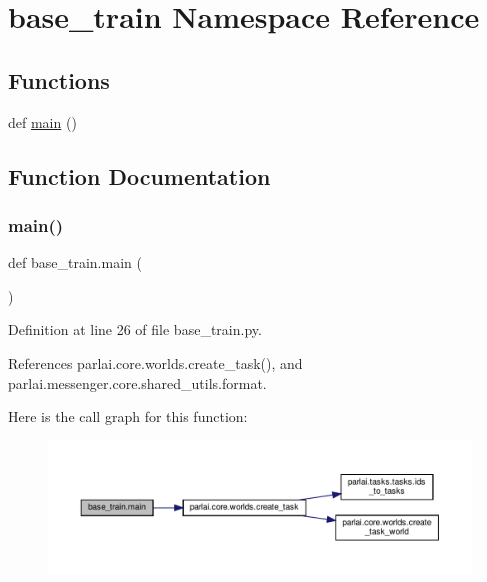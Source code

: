 \hypertarget{namespacebase__train}{}\section{base\+\_\+train Namespace Reference}
\label{namespacebase__train}
\subsection*{Functions}
\begin{DoxyCompactItemize}
\item 
def \hyperlink{namespacebase__train_afacf60925509c7e52f77f41e331261f3}{main} ()
\end{DoxyCompactItemize}


\subsection{Function Documentation}
\mbox{\label{namespacebase__train_afacf60925509c7e52f77f41e331261f3}} 
\subsubsection{\texorpdfstring{main()}{main()}}
{\footnotesize\ttfamily def base\+\_\+train.\+main (\begin{DoxyParamCaption}{ }\end{DoxyParamCaption})}



Definition at line 26 of file base\+\_\+train.\+py.



References parlai.\+core.\+worlds.\+create\+\_\+task(), and parlai.\+messenger.\+core.\+shared\+\_\+utils.\+format.

Here is the call graph for this function\+:
\nopagebreak
\begin{figure}[H]
\begin{center}
\leavevmode
\includegraphics[width=350pt]{namespacebase__train_afacf60925509c7e52f77f41e331261f3_cgraph}
\end{center}
\end{figure}
